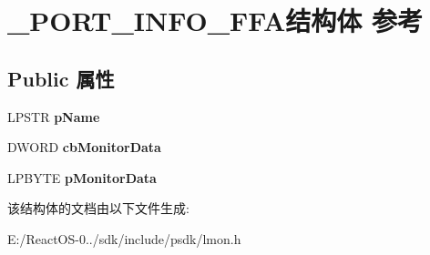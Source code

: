 \hypertarget{struct___p_o_r_t___i_n_f_o___f_f_a}{}\section{\+\_\+\+P\+O\+R\+T\+\_\+\+I\+N\+F\+O\+\_\+\+F\+F\+A结构体 参考}
\label{struct___p_o_r_t___i_n_f_o___f_f_a}
\subsection*{Public 属性}
\begin{DoxyCompactItemize}
\item 
\mbox{\label{struct___p_o_r_t___i_n_f_o___f_f_a_a4a10be3d387d35c163bfa61b35dd7cd6}} 
L\+P\+S\+TR {\bfseries p\+Name}
\item 
\mbox{\label{struct___p_o_r_t___i_n_f_o___f_f_a_add4809162b188fa0dec37ddf936727a3}} 
D\+W\+O\+RD {\bfseries cb\+Monitor\+Data}
\item 
\mbox{\label{struct___p_o_r_t___i_n_f_o___f_f_a_a357bea1a67ae1cd488ff2cd356c183c7}} 
L\+P\+B\+Y\+TE {\bfseries p\+Monitor\+Data}
\end{DoxyCompactItemize}


该结构体的文档由以下文件生成\+:\begin{DoxyCompactItemize}
\item 
E\+:/\+React\+O\+S-\/0../sdk/include/psdk/lmon.\+h\end{DoxyCompactItemize}
